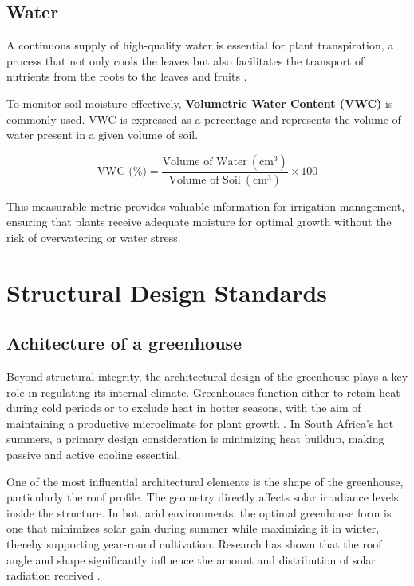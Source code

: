 \subsection{Water} 

A continuous supply of high-quality water is essential for plant transpiration, a process that not only cools the leaves but also facilitates the transport of nutrients from the roots to the leaves and fruits \cite{olabisi2022}.

To monitor soil moisture effectively, \textbf{Volumetric Water Content (VWC)} is commonly used. VWC is expressed as a percentage and represents the volume of water present in a given volume of soil.

\begin{equation}
\text{VWC (\%)} = \frac{\text{Volume of Water}~(\mathrm{cm}^3)}{\text{Volume of Soil}~(\mathrm{cm}^3)} \times 100
\end{equation}

This measurable metric provides valuable information for irrigation management, ensuring that plants receive adequate moisture for optimal growth without the risk of overwatering or water stress.


\section{Structural Design Standards}

\subsection{Achitecture of a greenhouse}\label{architecture}

Beyond structural integrity, the architectural design of the greenhouse plays a key role in regulating its internal climate. Greenhouses function either to retain heat during cold periods or to exclude heat in hotter seasons, with the aim of maintaining a productive microclimate for plant growth \cite{ghani2019}. In South Africa’s hot summers, a primary design consideration is minimizing heat buildup, making passive and active cooling essential.

One of the most influential architectural elements is the shape of the greenhouse, particularly the roof profile. The geometry directly affects solar irradiance levels inside the structure. In hot, arid environments, the optimal greenhouse form is one that minimizes solar gain during summer while maximizing it in winter, thereby supporting year-round cultivation. Research has shown that the roof angle and shape significantly influence the amount and distribution of solar radiation received \cite{ghani2019}.

